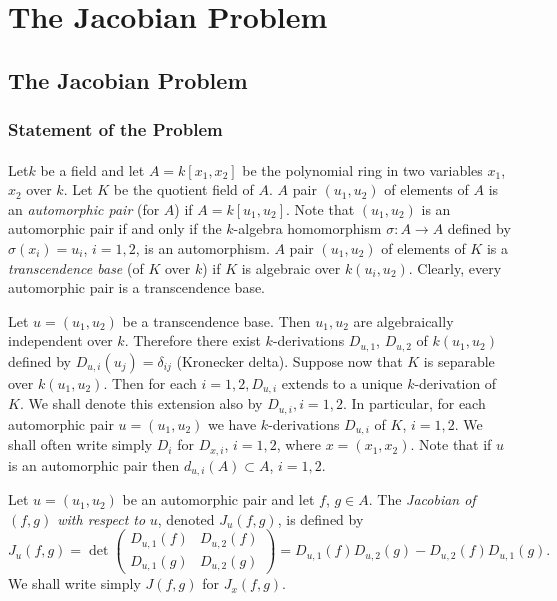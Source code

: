 
\part{The Jacobian Problem}\label{part2}

\chapter{The Jacobian Problem}\label{part2:chap6}

\setcounter{section}{14}
\section{Statement of the Problem}\label{part2:chap6:sec15}

\subsection{}\label{part2:chap6:sec15:ss15.1}

\setcounter{pageoriginal}{116}

Let\pageoriginale $k$ be a field and let $A= k[x_1, x_2]$ be the
polynomial ring in two variables $x_1$, $x_2$ over $k$. Let $K$ be the
quotient field of $A$. $A$ pair $(u_1, u_2)$ of elements of $A$ is an
{\em automorphic pair} (for $A$) if $A= k[u_1, u_2]$. Note that $(u_1,
u_2)$ is an automorphic pair if and only if the $k$-algebra
homomorphism $\sigma : A \to A$ defined by $\sigma (x_i) = u_i$, $i=1,
2$, is an automorphism. $A$ pair $(u_1, u_2)$ of elements of $K$ is a
{\em transcendence base} (of $K$ over $k$) if $K$ is algebraic over
$k(u_i , u_2)$. Clearly, every automorphic pair is a transcendence
base.

Let $u= (u_1, u_2)$ be a transcendence base. Then $u_1, u_2$ are
algebraically independent over $k$. Therefore there exist
$k$-derivations $D_{u, 1}$, $D_{u, 2}$ of $k(u_1, u_2)$ defined by
$D_{u, i}(u_j)= \delta_{ij}$ (Kronecker delta). Suppose now that $K$
is separable over $k(u_1, u_2)$. Then for each $i= 1, 2, D_{u, i}$
extends to a unique $k$-derivation of $K$. We shall denote this
extension also by $D_{u, i}, i=1, 2$. In particular, for each
automorphic pair $u= (u_1, u_2)$ we have $k$-derivations $D_{u,i}$ of
$K$, $i=1, 2$. We shall often write simply $D_i$ for $D_{x,i}$, $i=1,
2$, where $x= (x_1, x_2)$. Note that if $u$ is an automorphic pair
then $d_{u, i}(A) \subset A$, $i=1,2$. 

\setcounter{thm}{1}
\begin{defi}\label{part2:chap6:sec15:def15.2}
  Let $u= (u_1, u_2)$ be an automorphic pair and let $f$, $g \in
  A$. The {\em Jacobian of $(f, g)$ with respect to} $u$, denoted
  $J_u(f, g)$, is defined by
  $$
  J_u (f, g)= \det 
  \begin{pmatrix} 
    D_{u, 1} (f) & D_{u, 2}(f)\\
    D_{u, 1}(g) & D_{u, 2}(g)
  \end{pmatrix}
  = D_{u, 1} (f) D_{u, 2}(g) - D_{u, 2}(f) D_{u,1}(g).
  $$
  We shall write simply $J(f, g)$ for $J_x (f, g)$. 
\end{defi}

